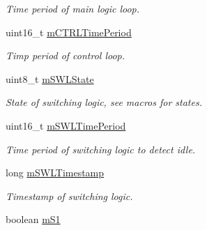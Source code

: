 \begin{DoxyCompactItemize}
\begin{DoxyCompactList}\small\item\em Time period of main logic loop. \end{DoxyCompactList}\item 
uint16\+\_\+t \hyperlink{classSPMB_1_1StateMachine_a57244a6945d6a7442f67563dea8f1754}{m\+C\+T\+R\+L\+Time\+Period}\hypertarget{classSPMB_1_1StateMachine_a57244a6945d6a7442f67563dea8f1754}{}\label{classSPMB_1_1StateMachine_a57244a6945d6a7442f67563dea8f1754}

\begin{DoxyCompactList}\small\item\em Timp period of control loop. \end{DoxyCompactList}\item 
uint8\+\_\+t \hyperlink{classSPMB_1_1StateMachine_a4ef617b6025ddafc0c3d033cb59935d7}{m\+S\+W\+L\+State}\hypertarget{classSPMB_1_1StateMachine_a4ef617b6025ddafc0c3d033cb59935d7}{}\label{classSPMB_1_1StateMachine_a4ef617b6025ddafc0c3d033cb59935d7}

\begin{DoxyCompactList}\small\item\em State of switching logic, see macros for states. \end{DoxyCompactList}\item 
uint16\+\_\+t \hyperlink{classSPMB_1_1StateMachine_a9736947bcb2c289d85c7588434fb93c8}{m\+S\+W\+L\+Time\+Period}\hypertarget{classSPMB_1_1StateMachine_a9736947bcb2c289d85c7588434fb93c8}{}\label{classSPMB_1_1StateMachine_a9736947bcb2c289d85c7588434fb93c8}

\begin{DoxyCompactList}\small\item\em Time period of switching logic to detect idle. \end{DoxyCompactList}\item 
long \hyperlink{classSPMB_1_1StateMachine_acd7bdae2efc3414abcf4e0eba1b3ac59}{m\+S\+W\+L\+Timestamp}\hypertarget{classSPMB_1_1StateMachine_acd7bdae2efc3414abcf4e0eba1b3ac59}{}\label{classSPMB_1_1StateMachine_acd7bdae2efc3414abcf4e0eba1b3ac59}

\begin{DoxyCompactList}\small\item\em Timestamp of switching logic. \end{DoxyCompactList}\item 
boolean \hyperlink{classSPMB_1_1StateMachine_af37ba6ce3ef9826cd025a6259c42449d}{m\+S1}\hypertarget{classSPMB_1_1StateMachine_af37ba6ce3ef9826cd025a6259c42449d}{}\label{classSPMB_1_1StateMachine_af37ba6ce3ef9826cd025a6259c42449d}


\end{DoxyCompactItemize}
